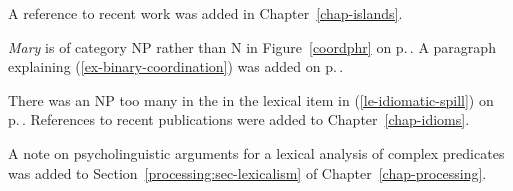


A reference to recent work was added in Chapter~\ref{chap-islands}.

\emph{Mary} is of category NP rather than N in Figure~\ref{coordphr} on p.\,\pageref{coordphr}. A
paragraph explaining (\ref{ex-binary-coordination}) was added on p.\,\pageref{ex-binary-coordination}.
%

%



There was an NP too many in the \compsl in the lexical item in (\ref{le-idiomatic-spill}) on
p.\,\pageref{le-idiomatic-spill}. 
References to recent publications were added to Chapter~\ref{chap-idioms}.








A note on psycholinguistic arguments for a lexical analysis of complex predicates was added to
Section~\ref{processing:sec-lexicalism} of Chapter~\ref{chap-processing}. 

%
%









